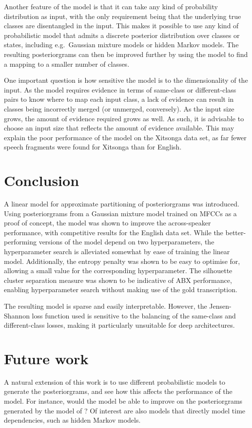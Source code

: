 Another feature of the model is that it can take any kind of probability distribution as input, with the only requirement being that the underlying true classes are disentangled in the input.
This makes it possible to use any kind of probabilistic model that admits a discrete posterior distribution over classes or states, including e.g.\ Gaussian mixture models or hidden Markov models.
The resulting posteriorgrams can then be improved further by using the model to find a mapping to a smaller number of classes.

One important question is how sensitive the model is to the dimensionality of the input.
As the model requires evidence in terms of same-class or different-class pairs to know where to map each input class, a lack of evidence can result in classes being incorrectly merged (or unmerged, conversely).
As the input size grows, the amount of evidence required grows as well.
As such, it is advisable to choose an input size that reflects the amount of evidence available.
This may explain the poor performance of the model on the Xitsonga data set, as far fewer speech fragments were found for Xitsonga than for English.

\section{Conclusion}
A linear model for approximate partitioning of posteriorgrams was introduced.
Using posteriorgrams from a Gaussian mixture model trained on MFCCs as a proof of concept, the model was shown to improve the across-speaker performance, with competitive results for the English data set.
While the better-performing versions of the model depend on two hyperparameters, the hyperparameter search is alleviated somewhat by ease of training the linear model.
Additionally, the entropy penalty was shown to be easy to optimise for, allowing a small value for the corresponding hyperparameter.
The silhouette cluster separation measure was shown to be indicative of ABX performance, enabling hyperparameter search without making use of the gold transcription.

The resulting model is sparse and easily interpretable.
However, the Jensen-Shannon loss function used is sensitive to the balancing of the same-class and different-class losses, making it particularly unsuitable for deep architectures.

\section{Future work}
A natural extension of this work is to use different probabilistic models to generate the posteriorgrams, and see how this affects the performance of the model.
For instance, would the model be able to improve on the posteriorgrams generated by the model of \textcite{chen2015parallel}?
Of interest are also models that directly model time dependencies, such as hidden Markov models.

